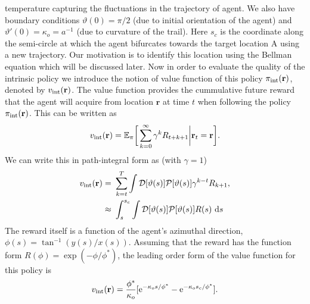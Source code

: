 \documentclass[%
reprint,
superscriptaddress,
floatfix,
amsmath,
amssymb,
aps,
notitlepage
]{revtex4-1}
\def\d{\text{d}}
\def\e{\text{e}}
\def\r{\mathbf{r}}
\def\E{\mathbb{E}}
\def\P{\mathcal{P}}
\def\D{\mathcal{D}}
\def\theta{\vartheta}
\begin{document}
temperature capturing the fluctuations in the trajectory of agent. We also have
boundary conditions $\theta(0) = \pi/2$ (due to initial orientation of the agent) and $\theta'(0) = \kappa_o = a^{-1}$ (due to curvature of the trail).
Here $s_c$ is the coordinate along the semi-circle at which the agent bifurcates towards the target location A using a new trajectory.
Our motivation is to identify this location using the Bellman equation which will be discussed later.
Now in order to evaluate the quality of the intrinsic policy we introduce the notion of value function
of this policy $\pi_{\rm int}(\r)$, denoted by $v_{\rm int}(\r)$. The value function provides the cummulative
future reward that the agent will acquire from location $\r$ at time $t$
when following the policy $\pi_{\rm int}(\r)$. This can be written as
\[
    v_{\rm int}(\r) = \E_\pi \bigg[ \sum_{k=0}^\infty \gamma^k R_{t+k+1} \bigg| \r_t = \r \bigg].
\]
We can write this in path-integral form as (with $\gamma = 1$)
\begin{align}
    v_{\rm int}(\r) =& \ \sum_{k=t}^T \int \D[\theta(s)] \P[\theta(s)] \gamma^{k-t} R_{k+1}, \\
    \approx& \ \int_{s}^{s_c} \int \D[\theta(s)] \P[\theta(s)] R(s) \ \d s
\end{align}
The reward itself is a function of the agent's azimuthal direction, $\phi(s) = \tan^{-1}(y(s)/x(s))$.
Assuming that the reward has the function form $R(\phi) = \exp(-\phi/\phi^*)$, the leading order form of 
the value function for this policy is
\[
    v_{\rm int}(\r) = \frac{\phi^*}{\kappa_o} [ \e^{-\kappa_o s/\phi^*} - \e^{-\kappa_o s_c/\phi^*}].
\]
\end{document}
